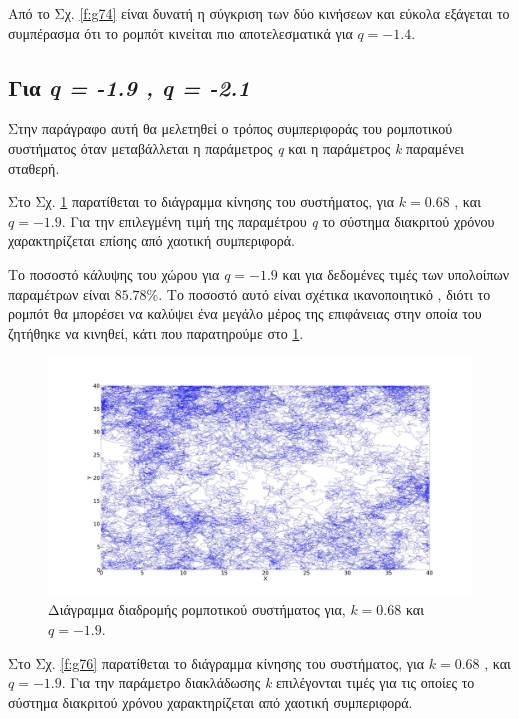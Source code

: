 Από το Σχ. \ref{f:g74} είναι δυνατή η σύγκριση των δύο κινήσεων και εύκολα εξάγεται το
συμπέρασμα ότι το ρομπότ κινείται πιο αποτελεσματικά για $q = -1.4$.

\clearpage

\subsection{Για \emph{q = -1.9 , q = -2.1}}

Στην παράγραφο αυτή θα μελετηθεί ο τρόπος συμπεριφοράς του ρομποτικού συστήματος όταν μεταβάλλεται η παράμετρος \emph{q} και η παράμετρος \emph{k} παραμένει σταθερή.

Στο Σχ. \ref{f:g75} παρατίθεται το διάγραμμα κίνησης του συστήματος, για $k=0.68$ , και $q = -1.9$. Για την επιλεγμένη τιμή της παραμέτρου \emph{q} το σύστημα διακριτού χρόνου χαρακτηρίζεται επίσης από χαοτική συμπεριφορά.

Το ποσοστό κάλυψης του χώρου για $q = -1.9$ και για δεδομένες τιμές των υπολοίπων παραμέτρων είναι $85.78 \%$. Το ποσοστό αυτό είναι σχέτικα ικανοποιητικό , διότι το ρομπότ θα μπορέσει να καλύψει ένα μεγάλο μέρος της επιφάνειας στην οποία του ζητήθηκε να κινηθεί, κάτι που παρατηρούμε στο \ref{f:g75}.


\begin{figure}[ht]
	\centering
	\includegraphics[width=1\linewidth]{LateX images/log/q/g2-1.9}
	\caption{Διάγραμμα διαδρομής ρομποτικού συστήματος για, $k = 0.68$ και $q = -1.9$.}
	\label{f:g75}	
\end{figure}

Στο Σχ. \ref{f:g76} παρατίθεται το διάγραμμα κίνησης του συστήματος, για $k=0.68$ , και $q = -1.9$. Για την παράμετρο διακλάδωσης \emph{k} επιλέγονται τιμές για τις οποίες το σύστημα διακριτού χρόνου χαρακτηρίζεται από χαοτική συμπεριφορά.


